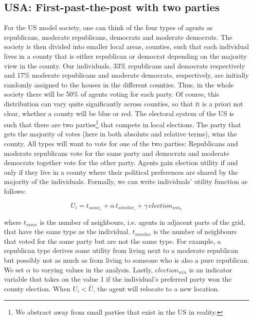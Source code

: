 \documentclass[12pt, a4paper]{article}
\begin{document}
	\subsection{USA: First-past-the-post with two parties}
	For the US model society, one can think of the four types of agents as republicans, moderate republicans, democrats and moderate democrats. The society is then divided into smaller local areas, counties, such that each individual lives in a county that is either republican or democrat depending on the majority view in the county. Our individuals, 33\% republicans and democrats respectively and 17\% moderate republicans and moderate democrats, respectively, are initially randomly assigned to the houses in the different counties. Thus, in the whole society there will be 50\% of agents voting for each party. Of course, this distribution can vary quite significantly across counties, so that it is a priori not clear, whether a county will be blue or red. The electoral system of the US is such that there are two parties\footnote{We abstract away from small parties that exist in the US in reality.} that compete in local elections. The party that gets the majority of votes (here in both absolute and relative terms), wins the county. All types will want to vote for one of the two parties: Republicans and moderate republicans vote for the same party and democrats and moderate democrats together vote for the other party. Agents gain election utility if and only if they live in a county where their political preferences are shared by the majority of the individuals. Formally, we can write individuals' utility function as follows:
	
	
	\begin{equation}
	U_i=t_{same_i}+\alpha \, t_{similar_i}+\gamma \, election_{win_c}
	\end{equation}
	
	where $t_{same}$ is the number of neighbours, i.e. agents in adjacent parts of the grid, that have the same type as the individual. $t_{similar}$ is the number of neighbours that voted for the same party but are not the same type. For example, a republican type derives some utility from living next to a moderate republican but possibly not as much as from living to someone who is also a pure republican. We set $\alpha$ to varying values in the analysis. Lastly, $election_{win}$ is an indicator variable that takes on the value 1 if the individual's preferred party won the county election. When $U_i < \bar{U}$, the agent will relocate to a new location.
	
\end{document}
